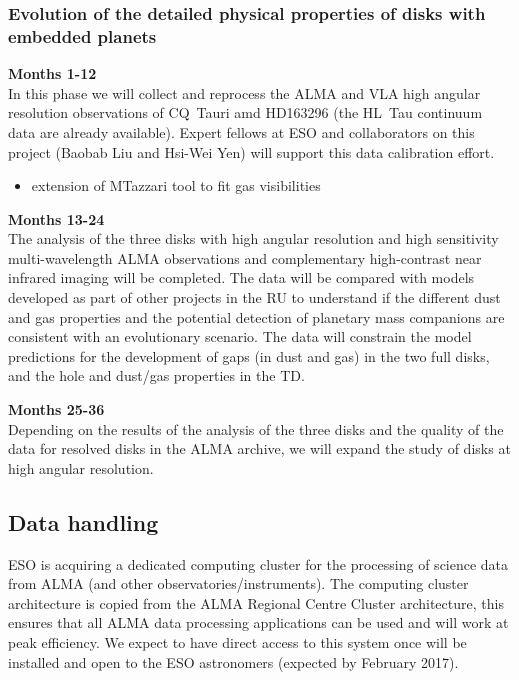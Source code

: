 \documentclass[10pt,fleqn,twoside]{article}
\newcommand{\Tcol}{\color{blue}}
\begin{document}
\subsubsection{\bf Evolution of the detailed physical properties of disks with embedded planets}

{\bf Months 1-12}\\
In this phase we will collect and reprocess the ALMA and VLA high angular resolution observations of CQ~Tauri amd HD163296 (the HL~Tau continuum data are already available). Expert fellows at ESO and collaborators on this project (Baobab Liu and Hsi-Wei Yen) will support this data calibration effort. 
\begin{itemize}
\item extension of MTazzari tool to fit gas visibilities
\end{itemize}

{\bf Months 13-24}\\
The analysis of the three disks with high angular resolution and high sensitivity multi-wavelength ALMA observations and complementary high-contrast near infrared imaging will be completed. The data will be compared with models developed as part of other projects in the RU to understand if the different dust 
and gas properties and the potential detection of planetary mass companions are consistent with an evolutionary scenario. The data will constrain the model predictions for the development of gaps (in dust and gas) in the two full disks, and the hole and dust/gas properties in the TD.

{\bf Months 25-36}\\

Depending on the results of the analysis of the three disks and the quality of the data for resolved disks in the ALMA archive, we will expand the study of disks at high angular resolution. 

\subsection{\Tcol Data handling}

ESO is acquiring a dedicated computing cluster for the processing of science data from ALMA (and other observatories/instruments). The computing cluster architecture is copied from the ALMA Regional Centre Cluster architecture, this ensures that all ALMA data processing applications can be used and will work at peak efficiency. We expect to have direct access to this system once will be installed and open to the ESO astronomers (expected by February 2017). 
\end{document}
